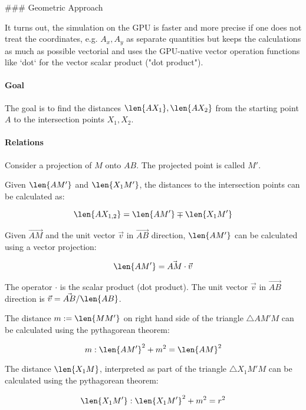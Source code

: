 ### Geometric Approach

It turns out, the simulation on the GPU is faster and more precise if one does not treat the coordinates, e.g. $A_x, A_y$ as separate quantities but keeps the calculations as much as possible vectorial and uses the GPU-native vector operation functions like `dot` for the vector scalar product ("dot product").


\paragraph{Goal} The goal is to find the distances $\len{AX_1}, \len{AX_2}$ from the starting point $A$ to the intersection points $X_1, X_2$.

\paragraph{Relations}

Consider a projection of $M$ onto $AB$. The projected point is called $M'$.

Given $\len{A M'}$ and $\len{X_1 M'}$, the distances to the intersection points can be calculated as:

\begin{equation} \len{A X_{1,2}} = \len{A M'} \mp \len{X_1 M'} \end{equation}

Given $\vec{AM}$ and the unit vector $\vec{v}$ in $\vec{AB}$ direction, $\len{AM'}$ can be calculated using a vector projection:

\begin{equation} \len{AM'} = \vec{AM} \cdot \vec{v} \end{equation}

The operator $\cdot$ is the scalar product (dot product). The unit vector $\vec{v}$ in $\vec{AB}$ direction is $\vec{v} = \vec{AB} / \len{AB}$.

The distance $m:=\len{MM'}$ on right hand side of the triangle $\triangle AM'M$ can be calculated using the pythagorean theorem:

\begin{equation} m: \len{AM'}^2 + m^2 = \len{AM}^2 \end{equation}

The distance $\len{X_1 M}$, interpreted as part of the triangle $\triangle X_1 M' M$ can be calculated using the pythagorean theorem:

\begin{equation} \len{X_1 M'}: \len{X_1 M'}^2 + m^2 = r^2 \end{equation}

